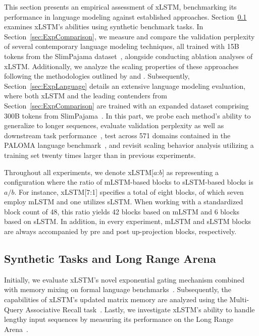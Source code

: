 This section presents an empirical assessment of xLSTM, benchmarking its performance in language modeling against established approaches. Section~\ref{sec:ExpSyntethic} examines xLSTM's abilities using synthetic benchmark tasks. In Section~\ref{sec:ExpComparison}, we measure and compare the validation perplexity of several contemporary language modeling techniques, all trained with 15B tokens from the SlimPajama dataset~\citep{Soboleva:23}, alongside conducting ablation analyses of xLSTM. Additionally, we analyze the scaling properties of these approaches following the methodologies outlined by \citet{Kaplan:20} and \citet{Brown:20short}. Subsequently, Section~\ref{sec:ExpLanguage} details an extensive language modeling evaluation, where both xLSTM and the leading contenders from Section~\ref{sec:ExpComparison} are trained with an expanded dataset comprising 300B tokens from SlimPajama~\citep{Soboleva:23}. In this part, we probe each method's ability to generalize to longer sequences, evaluate validation perplexity as well as downstream task performance~\citep{Sutawika:24}, test across 571 domains contained in the PALOMA language benchmark~\citep{Magnusson:23arxivshort}, and revisit scaling behavior analysis utilizing a training set twenty times larger than in previous experiments.

\label{sec:xlstm_blocks_notation}
Throughout all experiments, we denote xLSTM[$a$:$b$] as representing a configuration where the ratio of mLSTM-based blocks to sLSTM-based blocks is $a/b$. For instance, xLSTM[7:1] specifies a total of eight blocks, of which seven employ mLSTM and one utilizes sLSTM. When working with a standardized block count of 48, this ratio yields 42 blocks based on mLSTM and 6 blocks based on sLSTM. In addition, in every experiment, mLSTM and sLSTM blocks are always accompanied by pre and post up-projection blocks, respectively.

\subsection{Synthetic Tasks and Long Range Arena}
\label{sec:ExpSyntethic}
Initially, we evaluate xLSTM's novel exponential gating mechanism combined with memory mixing on formal language benchmarks~\citep{Deletang:23}. Subsequently, the capabilities of xLSTM's updated matrix memory are analyzed using the Multi-Query Associative Recall task~\citep{Arora:23arxiv}. Lastly, we investigate xLSTM's ability to handle lengthy input sequences by measuring its performance on the Long Range Arena~\citep{Tay:21}.


